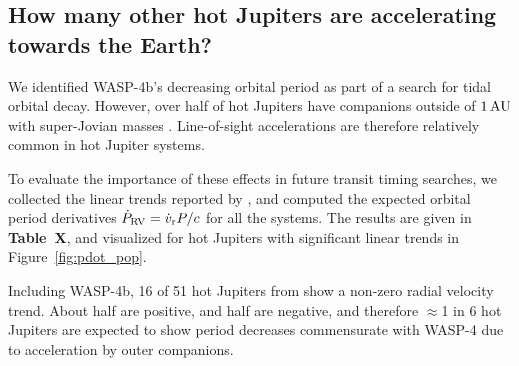 \documentclass[12pt,twocolumn,tighten]{aastex62}
\begin{document}




\subsection{How many other hot Jupiters are accelerating towards the
Earth?}

We identified WASP-4b's decreasing orbital period as part of a search
for tidal orbital decay.  However, over half of hot Jupiters have
companions outside of $1\,{\rm AU}$ with super-Jovian masses
\citep{knutson_friends_2014}.  Line-of-sight accelerations are
therefore relatively common in hot Jupiter systems. 

To evaluate the importance of these effects in future transit timing
searches, we collected the linear trends reported by
\citet{knutson_friends_2014}, and computed the expected orbital period
derivatives $\dot{P}_{\rm RV} = \dot{v}_{\rm r} P/c$ for all the
systems.
The results are given in {\bf Table~X}, and visualized for hot
Jupiters with significant linear trends in Figure~\ref{fig:pdot_pop}.

Including WASP-4b, 16 of 51 hot Jupiters from
\citet{knutson_friends_2014} show a non-zero radial velocity trend.
About half are positive, and half are negative, and therefore
$\approx$1 in 6 hot Jupiters are expected to show period decreases
commensurate with WASP-4 due to acceleration by outer companions.
\end{document}
